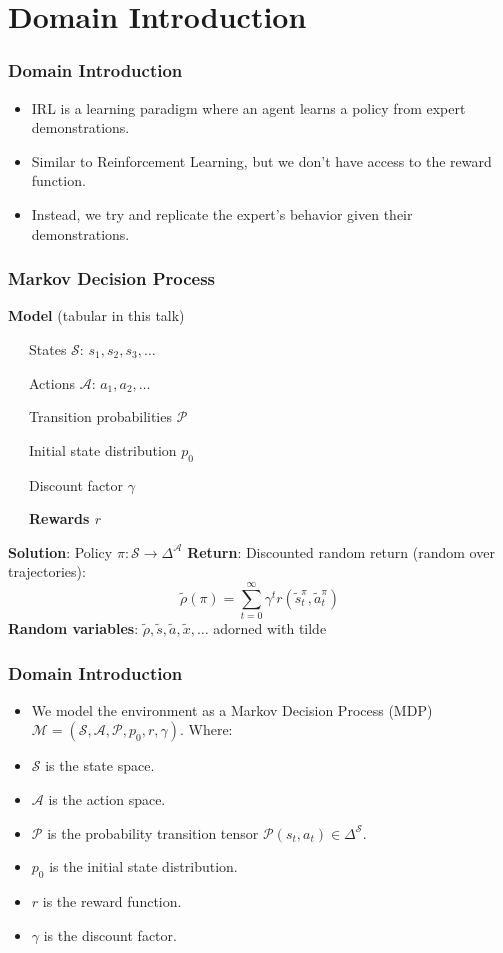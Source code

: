 \documentclass{beamer}
\begin{document}
\section*{Domain Introduction}

\begin{frame}
\frametitle{Domain Introduction}
	\begin{itemize}
		\item IRL is a learning paradigm where an agent learns a policy from expert demonstrations.
		\item Similar to Reinforcement Learning, but we don't have access to the reward function.
		\item Instead, we try and replicate the expert's behavior given their demonstrations.
	\end{itemize}
\end{frame}

\begin{frame} \frametitle{Markov Decision Process}
  \textbf{Model} (tabular in this talk) \par
    {\small
   ~~~States $\mathcal{S}$: $s_1, s_2, s_3, \dots $ \par
   ~~~Actions $\mathcal{A}$: $a_1, a_2, \dots $ \par
   ~~~Transition probabilities $\mathcal{P}$ \par
   ~~~Initial state distribution $p_0$ \par
   ~~~Discount factor $\gamma$ \par
   ~~~\textbf{Rewards $r$}}
    \vfill 
    \textbf{Solution}: Policy ${\pi}\colon \mathcal{S} \to \Delta^\mathcal{A}$
    \vfill
    \textbf{Return}: Discounted random return (random over trajectories):
    \[
      \tilde{\rho}(\pi) = \sum_{t=0}^\infty \gamma^t r(\tilde{s}^{\pi}_t, \tilde{a}^{{\pi}}_t)
    \]
    \vfill
    \textbf{Random variables}: $\tilde{\rho}, \tilde{s}, \tilde{a}, \tilde{x}, \dots $ adorned with tilde
\end{frame}

\begin{frame}
	\frametitle{Domain Introduction}
	\begin{itemize}
		\item We model the environment as a Markov Decision Process (MDP) $\mathcal{M} = (\mathcal{S}, \mathcal{A}, \mathcal{P}, p_0, r, \gamma)$. Where:
		\item $\mathcal{S}$ is the state space.
		\item $\mathcal{A}$ is the action space.
		\item $\mathcal{P}$ is the probability transition tensor $\mathcal{P}(s_t, a_t) \in \Delta^\mathcal{S}$.
		\item $p_0$ is the initial state distribution.
		\item $r$ is the reward function.
		\item $\gamma$ is the discount factor.
	\end{itemize}
\end{frame}
\end{document}

